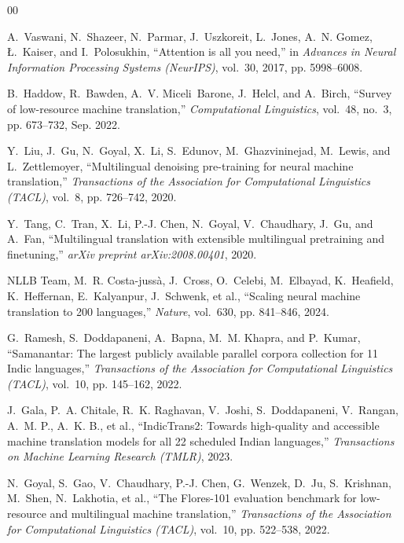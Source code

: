 \documentclass[conference]{IEEEtran}
\begin{document}
\begin{thebibliography}{00}

A.~Vaswani, N.~Shazeer, N.~Parmar, J.~Uszkoreit, L.~Jones, A.~N. Gomez, {\L}.~Kaiser, and I.~Polosukhin, ``Attention is all you need,'' in \textit{Advances in Neural Information Processing Systems (NeurIPS)}, vol.~30, 2017, pp. 5998--6008.

B.~Haddow, R.~Bawden, A.~V. Miceli~Barone, J.~Helcl, and A.~Birch, ``Survey of low-resource machine translation,'' \textit{Computational Linguistics}, vol.~48, no.~3, pp. 673--732, Sep. 2022.

Y.~Liu, J.~Gu, N.~Goyal, X.~Li, S.~Edunov, M.~Ghazvininejad, M.~Lewis, and L.~Zettlemoyer, ``Multilingual denoising pre-training for neural machine translation,'' \textit{Transactions of the Association for Computational Linguistics (TACL)}, vol.~8, pp. 726--742, 2020.

Y.~Tang, C.~Tran, X.~Li, P.-J. Chen, N.~Goyal, V.~Chaudhary, J.~Gu, and A.~Fan, ``Multilingual translation with extensible multilingual pretraining and finetuning,'' \textit{arXiv preprint arXiv:2008.00401}, 2020.

{NLLB Team}, M.~R. Costa-juss{\`a}, J.~Cross, O.~Celebi, M.~Elbayad, K.~Heafield, K.~Heffernan, E.~Kalyanpur, J.~Schwenk, et al., ``Scaling neural machine translation to 200 languages,'' \textit{Nature}, vol.~630, pp. 841--846, 2024.

G.~Ramesh, S.~Doddapaneni, A.~Bapna, M.~M. Khapra, and P.~Kumar, ``Samanantar: The largest publicly available parallel corpora collection for 11 Indic languages,'' \textit{Transactions of the Association for Computational Linguistics (TACL)}, vol.~10, pp. 145--162, 2022.

J.~Gala, P.~A. Chitale, R.~K. Raghavan, V.~Joshi, S.~Doddapaneni, V.~Rangan, A.~M. P., A.~K. B., et al., ``IndicTrans2: Towards high-quality and accessible machine translation models for all 22 scheduled Indian languages,'' \textit{Transactions on Machine Learning Research (TMLR)}, 2023.

N.~Goyal, S.~Gao, V.~Chaudhary, P.-J. Chen, G.~Wenzek, D.~Ju, S.~Krishnan, M.~Shen, N.~Lakhotia, et al., ``The Flores-101 evaluation benchmark for low-resource and multilingual machine translation,'' \textit{Transactions of the Association for Computational Linguistics (TACL)}, vol.~10, pp. 522--538, 2022.


\end{thebibliography}
\end{document}
